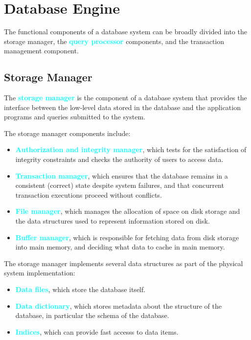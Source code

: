 \documentclass[a4paper,12pt,twoside,openany]{book}
\newcommand{\textcy}[1]{\textbf{\textcolor{cyan}{#1}}}
\begin{document}
\section{Database Engine}

The functional components of a database system can be broadly divided into the storage manager, the \textcy{query processor} components, and the transaction management component.

\subsection{Storage Manager}

The \textcy{storage manager} is the component of a database system that provides the interface between the low-level data stored in the database and the application programs and queries submitted to the system.

The storage manager components include:
\begin{itemize}
    \item\textcy{Authorization and integrity manager}, which tests for the satisfaction of integrity constraints and checks the authority of users to access data.
    \item\textcy{Transaction manager}, which ensures that the database remains in a consistent (correct) state despite system failures, and that concurrent transaction executions proceed without conflicts.
    \item\textcy{File manager}, which manages the allocation of space on disk storage and the data structures used to represent information stored on disk.
    \item\textcy{Buffer manager}, which is responsible for fetching data from disk storage into main memory, and deciding what data to cache in main memory.
\end{itemize}

The storage manager implements several data structures as part of the physical system implementation:
\begin{itemize}
    \item\textcy{Data files}, which store the database itself.
    \item\textcy{Data dictionary}, which stores metadata about the structure of the database, in particular the schema of the database.
    \item\textcy{Indices}, which can provide fast accesss to data items.
\end{itemize}
\end{document}
